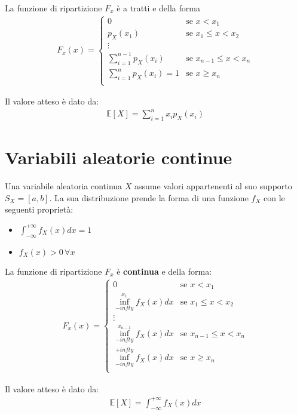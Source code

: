 \documentclass{article}
\begin{document}
La funzione di ripartizione $F_x$ \`e a tratti e della forma
\begin{align*}
F_x(x) = \begin{cases}
0 &\text{se } x < x_1 \\
p_X(x_1) &\text{se } x_1 \leq x < x_2 \\
\vdots \\
\sum_{i=1}^{n-1} p_X(x_i) &\text{se } x_{n-1} \leq x < x_{n} \\
\sum_{i=1}^n p_X(x_i) = 1 &\text{se } x \geq x_n \\
\end{cases}
\end{align*}

Il valore atteso \`e dato da:
\begin{align*}
\mathbb{E}[X] = \sum_{i=1}^n x_i p_X(x_i)
\end{align*}

\section{Variabili aleatorie continue}

Una variabile aleatoria continua $X$ assume valori appartenenti al suo supporto $S_X = [a, b]$.
La sua distribuzione prende la forma di una funzione $f_X$ con le seguenti propriet\`a:
\begin{itemize}
\item $\int_{-\infty}^{+\infty}f_X(x) dx = 1$
\item $f_X(x) > 0 \, \forall x$
\end{itemize}

La funzione di ripartizione $F_x$ \`e \textbf{continua} e della forma:
\begin{align*}
F_x(x) = \begin{cases}
0 &\text{se } x < x_1 \\
\inf_{-infty}^{x_1}f_X(x) dx &\text{se } x_1 \leq x < x_2 \\
\vdots \\
\inf_{-infty}^{x_{n-1}}f_X(x) dx &\text{se } x_{n-1} \leq x < x_n \\
\inf_{-infty}^{+infty}f_X(x) dx &\text{se } x \geq x_n \\
\end{cases}
\end{align*}

Il valore atteso \`e dato da:
\begin{align*}
\mathbb{E}[X] = \int_{-\infty}^{+\infty} f_X(x) dx
\end{align*}
\end{document}
